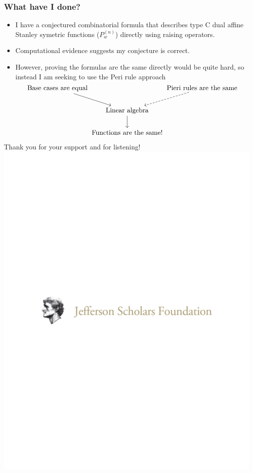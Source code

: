 \documentclass{beamer}
\begin{document}
\begin{frame}[fragile]
  \frametitle{What have I done?}
  \begin{itemize}
  \item I have a conjectured combinatorial formula that describes type
    C dual affine Stanley symetric functions (\(P_w^{(n)}\)) directly
    using raising operators. \pause 
  
   \item Computational evidence suggests my conjecture is correct. \pause
  
   \item However, proving the formulas are the same directly would be quite
    hard, so instead I am seeking to use the Peri rule approach \[
      \begin{tikzcd}[cramped, column sep=0.01em]
        \text{Base cases are equal} \ar[rd]&\, & \ar[ld, dashed] \text{Pieri rules are the same}\\
        \ &\text{Linear algebra} \ar[d] & \ \\
        \ &\text{Functions are the same!} & \
      \end{tikzcd}
    \]
  \end{itemize}
  \end{frame}
  \begin{frame}
    \begin{center}
      Thank you for your support and for listening!\\
      \includegraphics[scale=0.5]{images/jsf_horizontal_logo.pdf}
    \end{center}
  \end{frame}
\end{document}

